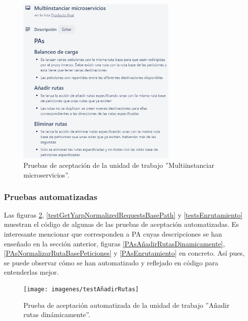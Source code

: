 \documentclass[11pt,spanish,listoffigures]{tfgetsinf}
\begin{document}
\begin{figure}[H] %
\centering
\includegraphics[width=0.7\textwidth]{imagenes/PAsMultiinstanciarMicroservicios}
\caption{Pruebas de aceptación de la unidad de trabajo ''Multiinstanciar microservicios''.}
	\label{PAsMultiinstanciaDeMicroservicios}
\end{figure}

\newpage %


			\subsubsection{Pruebas automatizadas}

Las figuras \ref{testAñadirRutas}, \ref{testGetYarpNormalizedRequestsBasePath} y \ref{testsEnrutamiento} muestran el código de algunas de las pruebas de aceptación automatizadas. Es interesante mencionar que corresponden a PA cuyas descripciones se han enseñado en la sección anterior, figuras \ref{PAsAñadirRutasDinamicamente}, \ref{PAsNormalizarRutaBasePeticiones} y \ref{PAsEnrutamiento} en concreto. Así pues, se puede observar cómo se han automatizado y reflejado en código para entenderlas mejor.

\begin{figure}[H] %
\centering
\texttt{[image: imagenes/testAñadirRutas]}
\caption{Prueba de aceptación automatizada de la unidad de trabajo ''Añadir rutas dinámicamente''.}
	\label{testAñadirRutas}
\end{figure}
\end{document}

